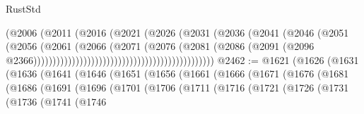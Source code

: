 \begin{lexlean}{RustStd}
\begin{coremodule}
                                                            (@2006
                                                              (@2011
                                                                (@2016
                                                                  (@2021
                                                                    (@2026
                                                                      (@2031
                                                                        (@2036
                                                                          (@2041
                                                                            (@2046
                                                                              (@2051
                                                                                (@2056
                                                                                  (@2061
                                                                                    (@2066
                                                                                      (@2071
                                                                                        (@2076
                                                                                          (@2081
                                                                                            (@2086
                                                                                              (@2091
                                                                                                (@2096
                                                                                                  @2366)))))))))))))))))))))))))))))))))))))))))))))))
@2462 := @1621
    (@1626
      (@1631
        (@1636
          (@1641
            (@1646
              (@1651
                (@1656
                  (@1661
                    (@1666
                      (@1671
                        (@1676
                          (@1681
                            (@1686
                              (@1691
                                (@1696
                                  (@1701
                                    (@1706
                                      (@1711
                                        (@1716
                                          (@1721
                                            (@1726
                                              (@1731
                                                (@1736
                                                  (@1741
                                                    (@1746

\end{coremodule}
\end{lexlean}
